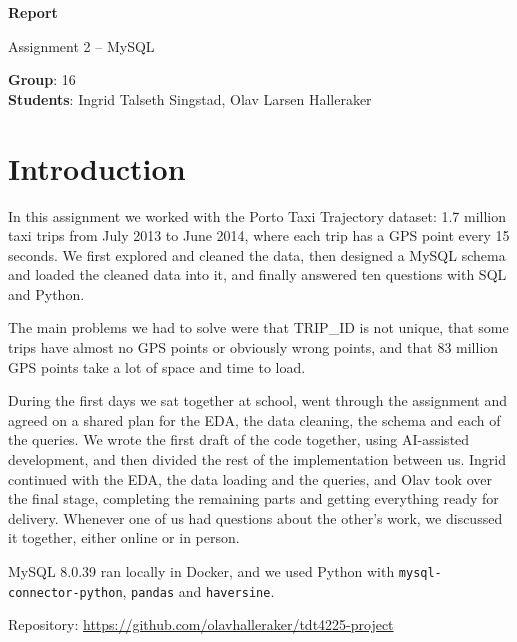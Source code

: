 \documentclass[12pt,a4paper]{article}
\begin{document}
\vspace*{0pt}
\begin{center}
  {\fontsize{18}{22}\selectfont\bfseries Report\par}
  \vspace{4pt}
  {\fontsize{14}{17}\selectfont Assignment 2 -- MySQL\par}
\end{center}
\vspace{12pt}

\textbf{Group}: 16\\
\textbf{Students}: Ingrid Talseth Singstad, Olav Larsen Halleraker

\vspace{12pt}

\section*{Introduction}

In this assignment we worked with the Porto Taxi Trajectory dataset:
1.7 million taxi trips from July 2013 to June 2014, where each trip has a
GPS point every 15 seconds. We first explored and cleaned the data, then
designed a MySQL schema and loaded the cleaned data into it, and finally
answered ten questions with SQL and Python.

The main problems we had to solve were that TRIP\_ID is not unique, that
some trips have almost no GPS points or obviously wrong points, and that
83 million GPS points take a lot of space and time to load.

During the first days we sat together at school, went through the assignment and agreed on 
a shared plan for the EDA, the data cleaning, the schema and each of the 
queries. We wrote the first draft of the code together, using AI-assisted
development, and then divided the rest of the implementation between us.
Ingrid continued with the EDA, the data loading and the queries, and
Olav took over the final stage, completing the remaining parts and
getting everything ready for delivery. Whenever one of us had questions
about the other's work, we discussed it together, either online or in person.

MySQL 8.0.39 ran locally in Docker, and we used Python with
\texttt{mysql-connector-python}, \texttt{pandas} and \texttt{haversine}.

Repository: \url{https://github.com/olavhalleraker/tdt4225-project}
\end{document}
